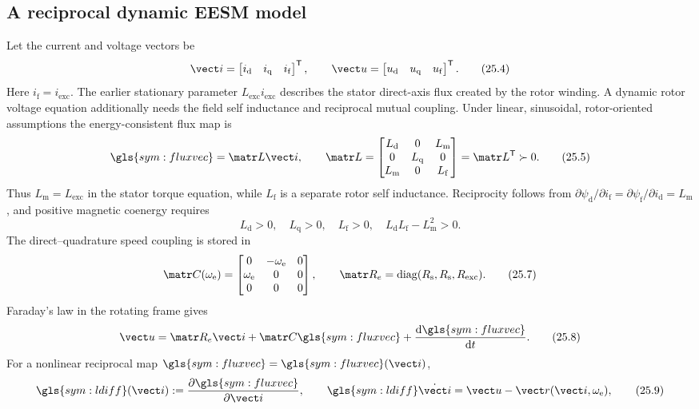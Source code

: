 \subsection{A reciprocal dynamic EESM model}
\label{subsec:dynamic-eesm}

Let the current and voltage vectors be
\[
 \vect i=\begin{bmatrix}i_{\mathrm d}&i_{\mathrm q}&i_{\mathrm f}\end{bmatrix}^{\mathsf T},
 \qquad
 \vect u=\begin{bmatrix}u_{\mathrm d}&u_{\mathrm q}&u_{\mathrm f}\end{bmatrix}^{\mathsf T}.
 \tag{25.4}
\]
Here \(i_{\mathrm f}=i_{\mathrm{exc}}\).  The earlier stationary parameter
\(L_{\mathrm{exc}}i_{\mathrm{exc}}\) describes the stator direct-axis flux
created by the rotor winding.  A dynamic rotor voltage equation additionally
needs the field self inductance and reciprocal mutual coupling.  Under linear,
sinusoidal, rotor-oriented assumptions the energy-consistent flux map is
\[
 \gls{sym:fluxvec}=\matr L\vect i,
 \qquad
 \matr L=
 \begin{bmatrix}
 L_{\mathrm d}&0&L_{\mathrm m}\\
 0&L_{\mathrm q}&0\\
 L_{\mathrm m}&0&L_{\mathrm f}
 \end{bmatrix}=\matr L^{\mathsf T}\succ0.
 \tag{25.5}
\]
Thus \(L_{\mathrm m}=L_{\mathrm{exc}}\) in the stator torque equation, while
\(L_{\mathrm f}\) is a separate rotor self inductance.  Reciprocity follows
from \(\partial\psi_{\mathrm d}/\partial i_{\mathrm f}
=\partial\psi_{\mathrm f}/\partial i_{\mathrm d}=L_{\mathrm m}\), and positive
magnetic coenergy requires
\[
 L_{\mathrm d}>0,\quad L_{\mathrm q}>0,\quad L_{\mathrm f}>0,
 \quad L_{\mathrm d}L_{\mathrm f}-L_{\mathrm m}^2>0.
 \tag{25.6}
\]
The direct--quadrature speed coupling is stored in
\[
 \matr C(\omega_{\mathrm e})=
 \begin{bmatrix}0&-\omega_{\mathrm e}&0\\
 \omega_{\mathrm e}&0&0\\0&0&0\end{bmatrix},
 \qquad
 \matr R_e=\operatorname{diag}(R_{\mathrm s},R_{\mathrm s},R_{\mathrm{exc}}).
 \tag{25.7}
\]
Faraday's law in the rotating frame gives
\[
 \vect u=\matr R_e\vect i+\matr C\gls{sym:fluxvec}
          +\frac{\mathrm d\gls{sym:fluxvec}}{\mathrm dt}.
 \tag{25.8}
\]
For a nonlinear reciprocal map \(\gls{sym:fluxvec}=\gls{sym:fluxvec}(\vect i)\),
\[
 \gls{sym:ldiff}(\vect i):=
 \frac{\partial\gls{sym:fluxvec}}{\partial\vect i},\qquad
 \gls{sym:ldiff}\dot{\vect i}
 =\vect u-\vect r(\vect i,\omega_{\mathrm e}),
 \tag{25.9}
\]
